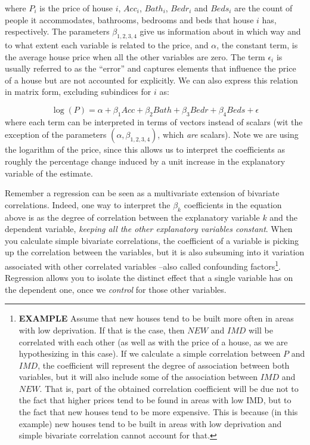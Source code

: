 \documentclass[
  letterpaper,
  krantz2]{style/krantz}
\begin{document}
where \(P_i\) is the price of house \(i\), \(Acc_i\), \(Bath_i\),
\(Bedr_i\) and \(Beds_i\) are the count of people it accommodates,
bathrooms, bedrooms and beds that house \(i\) has, respectively. The
parameters \(\beta_{1,2, 3, 4}\) give us information about in which way
and to what extent each variable is related to the price, and
\(\alpha\), the constant term, is the average house price when all the
other variables are zero. The term \(\epsilon_i\) is usually referred to
as the ``error'' and captures elements that influence the price of a
house but are not accounted for explicitly. We can also express this
relation in matrix form, excluding subindices for \(i\) as:

\[
\log(P) = \alpha + \beta_1 Acc + \beta_2 Bath + \beta_3 Bedr + \beta_4 Beds + \epsilon
\] where each term can be interpreted in terms of vectors instead of
scalars (wit the exception of the parameters
\((\alpha, \beta_{1, 2, 3, 4})\), which \emph{are} scalars). Note we are
using the logarithm of the price, since this allows us to interpret the
coefficients as roughly the percentage change induced by a unit increase
in the explanatory variable of the estimate.

Remember a regression can be seen as a multivariate extension of
bivariate correlations. Indeed, one way to interpret the \(\beta_k\)
coefficients in the equation above is as the degree of correlation
between the explanatory variable \(k\) and the dependent variable,
\emph{keeping all the other explanatory variables constant}. When you
calculate simple bivariate correlations, the coefficient of a variable
is picking up the correlation between the variables, but it is also
subsuming into it variation associated with other correlated variables
--also called confounding factors\footnote{\textbf{EXAMPLE} Assume that
  new houses tend to be built more often in areas with low deprivation.
  If that is the case, then \(NEW\) and \(IMD\) will be correlated with
  each other (as well as with the price of a house, as we are
  hypothesizing in this case). If we calculate a simple correlation
  between \(P\) and \(IMD\), the coefficient will represent the degree
  of association between both variables, but it will also include some
  of the association between \(IMD\) and \(NEW\). That is, part of the
  obtained correlation coefficient will be due not to the fact that
  higher prices tend to be found in areas with low IMD, but to the fact
  that new houses tend to be more expensive. This is because (in this
  example) new houses tend to be built in areas with low deprivation and
  simple bivariate correlation cannot account for that.}. Regression
allows you to isolate the distinct effect that a single variable has on
the dependent one, once we \emph{control} for those other variables.
\end{document}
